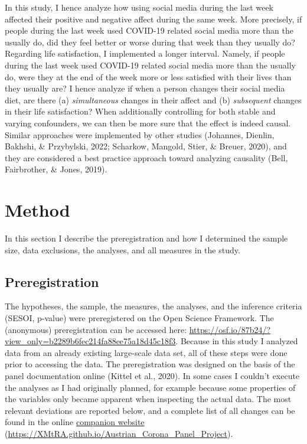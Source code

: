 \documentclass[
  man,mask]{apa6}
\begin{document}
In this study, I hence analyze how using social media during the last week affected their positive and negative affect during the same week.
More precisely, if people during the last week used COVID-19 related social media more than the usually do, did they feel better or worse during that week than they usually do?
Regarding life satisfaction, I implemented a longer interval.
Namely, if people during the last week used COVID-19 related social media more than the usually do, were they at the end of the week more or less satisfied with their lives than they usually are?
I hence analyze if when a person changes their social media diet, are there (a) \emph{simultaneous} changes in their affect and (b) \emph{subsequent} changes in their life satisfaction?
When additionally controlling for both stable and varying confounders, we can then be more sure that the effect is indeed causal.
Similar approaches were implemented by other studies (Johannes, Dienlin, Bakhshi, \& Przybylski, 2022; Scharkow, Mangold, Stier, \& Breuer, 2020), and they are considered a best practice approach toward analyzing causality (Bell, Fairbrother, \& Jones, 2019).

\hypertarget{method}{%
\section{Method}\label{method}}

In this section I describe the preregistration and how I determined the sample size, data exclusions, the analyses, and all measures in the study.

\hypertarget{preregistration}{%
\subsection{Preregistration}\label{preregistration}}

The hypotheses, the sample, the measures, the analyses, and the inference criteria (SESOI, p-value) were preregistered on the Open Science Framework.
The (anonymous) preregistration can be accessed here: \url{https://osf.io/87b24/?view_only=b2289b6fec214fa88ee75a18d45c18f3}.
Because in this study I analyzed data from an already existing large-scale data set, all of these steps were done prior to accessing the data.
The preregistration was designed on the basis of the panel documentation online (Kittel et al., 2020).
In some cases I couldn't execute the analyses as I had originally planned, for example because some properties of the variables only became apparent when inspecting the actual data.
The most relevant deviations are reported below, and a complete list of all changes can be found in the online \href{https://XMtRA.github.io/Austrian_Corona_Panel_Project}{companion website} (\url{https://XMtRA.github.io/Austrian_Corona_Panel_Project}).
\end{document}
